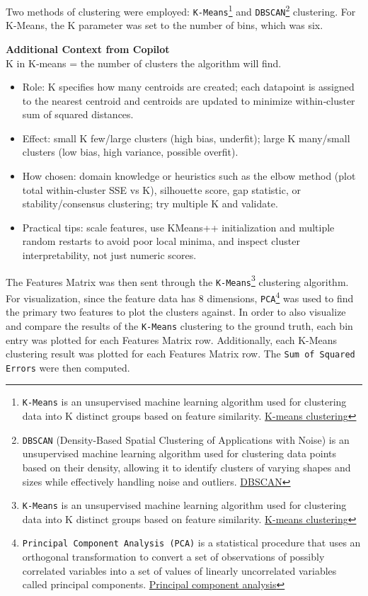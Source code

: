 Two methods of clustering were employed: \texttt{K-Means}\footnote{\texttt{K-Means} is an unsupervised machine learning algorithm used for clustering data into K distinct groups based on feature similarity. \href{https://en.wikipedia.org/wiki/K-means\_clustering}{K-means clustering}} and \texttt{DBSCAN}\footnote{\texttt{DBSCAN} (Density-Based Spatial Clustering of Applications with Noise) is an unsupervised machine learning algorithm used for clustering data points based on their density, allowing it to identify clusters of varying shapes and sizes while effectively handling noise and outliers. \href{https://en.wikipedia.org/wiki/DBSCAN}{DBSCAN}} clustering.  For K-Means, the K parameter was set to the number of bins, which was six.

\begin{framed}
\textbf{Additional Context from Copilot}\\
K in K‑means = the number of clusters the algorithm will find.

\begin{itemize}
\item Role: K specifies how many centroids are created; each datapoint is assigned to the nearest centroid and centroids are updated to minimize within‑cluster sum of squared distances.
\item Effect: small K \rightarrow few/large clusters (high bias, underfit); large K \rightarrow many/small clusters (low bias, high variance, possible overfit).
\item How chosen: domain knowledge or heuristics such as the elbow method (plot total within‑cluster SSE vs K), silhouette score, gap statistic, or stability/consensus clustering; try multiple K and validate.
\item Practical tips: scale features, use KMeans++ initialization and multiple random restarts to avoid poor local minima, and inspect cluster interpretability, not just numeric scores.
\end{itemize}
\end{framed}

The Features Matrix was then sent through the \texttt{K-Means}\footnote{\texttt{K-Means} is an unsupervised machine learning algorithm used for clustering data into K distinct groups based on feature similarity. \href{https://en.wikipedia.org/wiki/K-means\_clustering}{K-means clustering}} clustering algorithm.  For visualization, since the feature data has 8 dimensions, \texttt{PCA}\footnote{\texttt{Principal Component Analysis (PCA)} is a statistical procedure that uses an orthogonal transformation to convert a set of observations of possibly correlated variables into a set of values of linearly uncorrelated variables called principal components. \href{https://en.wikipedia.org/wiki/Principal\_component\_analysis}{Principal component analysis}} was used to find the primary two features to plot the clusters against.  In order to also visualize and compare the results of the \texttt{K-Means} clustering to the ground truth, each bin entry was plotted for each Features Matrix row.  Additionally, each K-Means clustering result was plotted for each Features Matrix row.  The \texttt{Sum of Squared Errors} were then computed.

